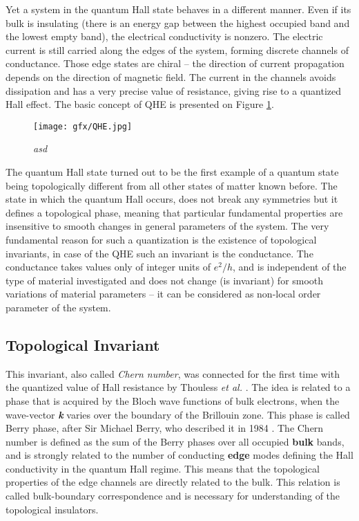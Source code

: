 \documentclass[titlepage,a4paper]{book}
\newcommand{\wciecie}{\quad\phantom{v}}
\begin{document}
Yet a system in the quantum Hall state behaves in a different manner. Even if its bulk is insulating (there is an energy gap between the highest occupied band and the lowest empty band), the electrical conductivity is nonzero. The electric current is still carried along the edges of the system, forming discrete channels of conductance. Those edge states are chiral -- the direction of current propagation depends on the direction of magnetic field. The current in the channels avoids dissipation and has a very precise value of resistance, giving rise to a quantized Hall effect. The basic concept of QHE is presented on Figure \ref{fig:QHE}. 
\begin{figure}[ht]
	\centering
	\texttt{[image: gfx/QHE.jpg]}
	\vspace{-10pt}
	\caption{\textit{asd}}
	\label{fig:QHE}
\end{figure} 

The quantum Hall state turned out to be the first example of a quantum state being topologically different from all other states of matter known before. The state in which the quantum Hall occurs, does not break any symmetries but it defines a topological phase, meaning that particular fundamental properties are insensitive to smooth changes in general parameters of the system. The very fundamental reason for such a quantization is the existence of topological invariants, in case of the QHE such an invariant is the conductance. The conductance takes values only of integer units of $e^2/h$, and is independent of the type of material investigated and does not change (is invariant) for smooth variations of material parameters – it can be considered as non-local order parameter of the system.  

\subsection{Topological Invariant}
\wciecie
This invariant, also called \textit{Chern number}, was connected for the first time with the quantized value of Hall resistance by Thouless \textit{et al.} \cite{Thouless_Topology}. The idea is related to a phase that is acquired by the Bloch wave functions of bulk electrons, when the wave-vector \textbf{\textit{k}} varies over the boundary of the Brillouin zone. This phase is called Berry phase, after Sir Michael Berry, who described it in 1984 \cite{Berry_phase}. The Chern number is defined as the sum of the Berry phases over all occupied \textbf{bulk} bands, and is strongly related to the number of conducting \textbf{edge} modes defining the Hall conductivity in the quantum Hall regime. This means that the topological properties of the edge channels are directly related to the bulk. This relation is called bulk-boundary correspondence and is necessary for understanding of the topological insulators.
\end{document}
